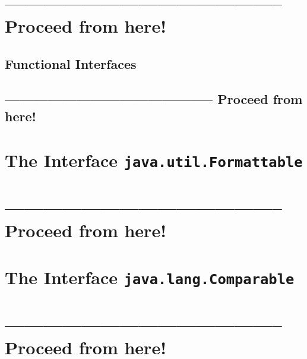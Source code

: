 \section{-------------------------------------------- Proceed from here!}
\lipsum[5]


\subsection{Functional Interfaces}\label{sec:FunctionalInterfaces}
\subsection{-------------------------------------------- Proceed from here!}
\lipsum[5]


\section{The Interface \lstinline|java.util.Formattable|}\label{sec:FormattableInterface}
\section{-------------------------------------------- Proceed from here!}

\autocite{ORACLE_DOC_STRING_CLASS}
\autocite{ORACLE_DOC_STRINGBUFFER_CLASS}
\autocite{ORACLE_DOC_STRINGBUILDER_CLASS}
\autocite{ORACLE_DOC_STRINGJOINER_CLASS}
\autocite{ORACLE_DOC_FORMATTER_CLASS}
\autocite{ORACLE_DOC_FORMATTABLE_INTERFACE}

\lipsum[1]


\section{The Interface \lstinline|java.lang.Comparable|}\label{sec:ComparableInterface}
\section{-------------------------------------------- Proceed from here!}
\lipsum[5]


